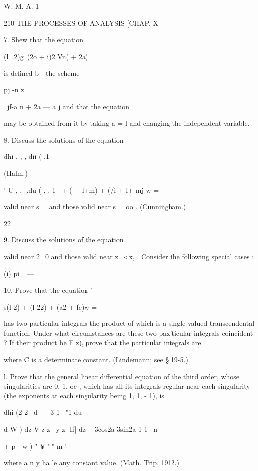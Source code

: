 W. M. A. 1

210 THE PROCESSES OF ANALYSIS [CHAP. X

7. Shew that the equation

(l\ .2)g\ (2o + i)2 Vn( + 2a) =

is defined b\ \ the scheme

pj -n z

\ jf-a n + 2a — a j and that the equation

may be obtained from it by taking a = l and changing the independent
variable.

8. Discuss the solutions of the equation

dhi , , , dii ( ,1

(Halm.)

'-U , , -.du ( , . 1 \ + ( + l+m) + (/i + l+ mj w =

valid near s = and those valid near s = oo . (Cunningham.)

 22

9. Discuss the solutions of the equation

valid near 2=0 and those valid near z=<x, . Consider the following
special cases :

(i) pi= —%

10. Prove that the equation '

s(l-2) +-(l-22) + (a2 + fe)w =

has two particular integrals the product of which is a single-valued
transcendental function. Under what circumstances are these two
pax'ticular integrals coincident ? If their product be F z), prove
that the particular integrals are

where C is a determinate constant. (Lindemann; see § 19-5.)

l. Prove that the general linear differential equation of the third
order, whose singularities are 0, 1, oc , which has all its integrals
regular near each singularity (the exponents at each singularity being
1, 1, - 1), is

dhi (2 2 \ d \ \ \ 3 1 \ "1 du

d W ) dz V z z-\ y z- If] dz \ \ 3cos2a 3sin2a 1 1 \ n

+ p - w ) " ¥ ' " m '

where a n y ha 'e any constant value. (Math. Trip. 1912.)

